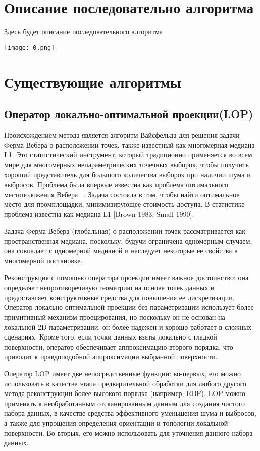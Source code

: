 

\section{Описание последовательно алгоритма}
Здесь будет описание последовательного алгоритма  

\texttt{[image: 0.png]}


\section{Существующие алгоритмы}
\subsection{Оператор локально-оптимальной проекции(LOP)}
Происхождением метода является алгоритм Вайсфельда для решения задачи Ферма-Вебера о расположении точек, также известный как многомерная медиана L1. Это статистический инструмент, который традиционно применяется во всем мире для многомерных непараметрических точечных выборок, чтобы получить хороший представитель для большого количества выборок при наличии шума и выбросов. Проблема была впервые известна как проблема оптимального местоположения Вебера ~\cite{WEBER}. Задача состояла в том, чтобы найти оптимальное место для промплощадки, минимизирующее стоимость доступа. В статистике проблема известна как медиана L1 [Brown 1983; Small 1990].

Задача Ферма-Вебера (глобальная) о расположении точек рассматривается как пространственная медиана, поскольку, будучи ограничена одномерным случаем, она совпадает с одномерной медианой и наследует некоторые ее свойства в многомерной постановке.

Реконструкция с помощью оператора проекции имеет важное достоинство: она определяет непротиворечивую геометрию на основе точек данных и предоставляет конструктивные средства для повышения ее дискретизации. 
Оператор локально-оптимальной проекции без параметризации использует более примитивный механизм проецирования, но поскольку он не основан на локальной 2D-параметризации, он более надежен и хорошо работает в сложных сценариях. Кроме того, если точки данных взяты локально с гладкой поверхности, оператор обеспечивает аппроксимацию второго порядка, что приводит к правдоподобной аппроксимации выбранной поверхности.

Оператор LOP имеет две непосредственные функции: во-первых, его можно использовать в качестве этапа предварительной обработки для любого другого метода реконструкции более высокого порядка (например, RBF). LOP можно применять к необработанным отсканированным данным для создания чистого набора данных, в качестве средства эффективного уменьшения шума и выбросов, а также для упрощения определения ориентации и топологии локальной поверхности. Во-вторых, его можно использовать для уточнения данного набора данных.

